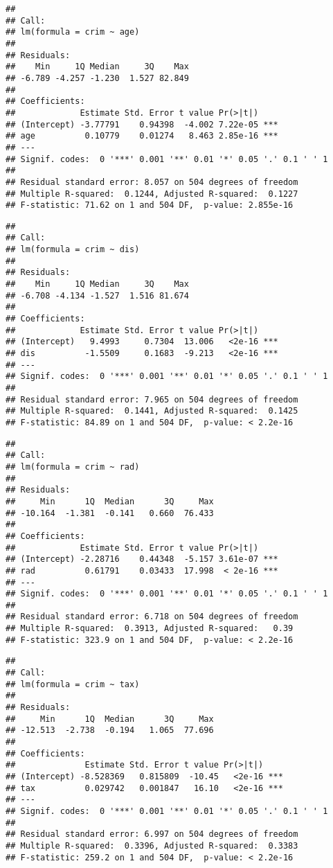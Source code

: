 \documentclass[
]{article}
\begin{document}
\begin{verbatim}
## 
## Call:
## lm(formula = crim ~ age)
## 
## Residuals:
##    Min     1Q Median     3Q    Max 
## -6.789 -4.257 -1.230  1.527 82.849 
## 
## Coefficients:
##             Estimate Std. Error t value Pr(>|t|)    
## (Intercept) -3.77791    0.94398  -4.002 7.22e-05 ***
## age          0.10779    0.01274   8.463 2.85e-16 ***
## ---
## Signif. codes:  0 '***' 0.001 '**' 0.01 '*' 0.05 '.' 0.1 ' ' 1
## 
## Residual standard error: 8.057 on 504 degrees of freedom
## Multiple R-squared:  0.1244, Adjusted R-squared:  0.1227 
## F-statistic: 71.62 on 1 and 504 DF,  p-value: 2.855e-16
\end{verbatim}

\begin{verbatim}
## 
## Call:
## lm(formula = crim ~ dis)
## 
## Residuals:
##    Min     1Q Median     3Q    Max 
## -6.708 -4.134 -1.527  1.516 81.674 
## 
## Coefficients:
##             Estimate Std. Error t value Pr(>|t|)    
## (Intercept)   9.4993     0.7304  13.006   <2e-16 ***
## dis          -1.5509     0.1683  -9.213   <2e-16 ***
## ---
## Signif. codes:  0 '***' 0.001 '**' 0.01 '*' 0.05 '.' 0.1 ' ' 1
## 
## Residual standard error: 7.965 on 504 degrees of freedom
## Multiple R-squared:  0.1441, Adjusted R-squared:  0.1425 
## F-statistic: 84.89 on 1 and 504 DF,  p-value: < 2.2e-16
\end{verbatim}

\begin{verbatim}
## 
## Call:
## lm(formula = crim ~ rad)
## 
## Residuals:
##     Min      1Q  Median      3Q     Max 
## -10.164  -1.381  -0.141   0.660  76.433 
## 
## Coefficients:
##             Estimate Std. Error t value Pr(>|t|)    
## (Intercept) -2.28716    0.44348  -5.157 3.61e-07 ***
## rad          0.61791    0.03433  17.998  < 2e-16 ***
## ---
## Signif. codes:  0 '***' 0.001 '**' 0.01 '*' 0.05 '.' 0.1 ' ' 1
## 
## Residual standard error: 6.718 on 504 degrees of freedom
## Multiple R-squared:  0.3913, Adjusted R-squared:   0.39 
## F-statistic: 323.9 on 1 and 504 DF,  p-value: < 2.2e-16
\end{verbatim}

\begin{verbatim}
## 
## Call:
## lm(formula = crim ~ tax)
## 
## Residuals:
##     Min      1Q  Median      3Q     Max 
## -12.513  -2.738  -0.194   1.065  77.696 
## 
## Coefficients:
##              Estimate Std. Error t value Pr(>|t|)    
## (Intercept) -8.528369   0.815809  -10.45   <2e-16 ***
## tax          0.029742   0.001847   16.10   <2e-16 ***
## ---
## Signif. codes:  0 '***' 0.001 '**' 0.01 '*' 0.05 '.' 0.1 ' ' 1
## 
## Residual standard error: 6.997 on 504 degrees of freedom
## Multiple R-squared:  0.3396, Adjusted R-squared:  0.3383 
## F-statistic: 259.2 on 1 and 504 DF,  p-value: < 2.2e-16
\end{verbatim}
\end{document}
